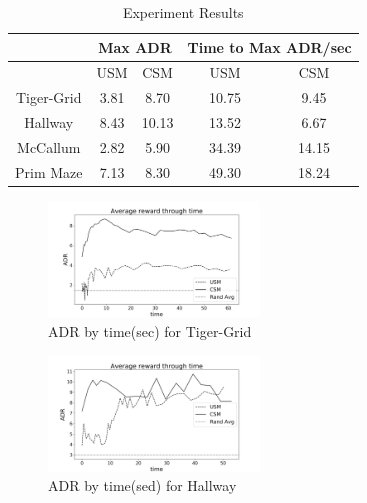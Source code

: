 \documentclass{article}
\begin{document}
\begin{table}[]
	  \caption{Experiment Results}
	\label{table:results}
	\centering
	\begin{tabular}{|c|c|c|c|c|}
		\hline
		& \multicolumn{2}{c|}{Max ADR} & \multicolumn{2}{c|}{Time to Max ADR/sec} \\ \hline
		& USM           & CSM          & USM                 & CSM                \\ \hline
		Tiger-Grid &3.81              & 8.70            &10.75                   & 9.45                  \\ \hline
		Hallway    & 8.43             & 10.13             & 13.52                 & 6.67                  \\ \hline
		McCallum   & 2.82             &5.90          & 34.39                  & 14.15                 \\ \hline
		Prim Maze  &7.13            & 8.30           &49.30                   & 18.24                 \\ \hline
	\end{tabular}
\end{table}


\begin{figure}
	\centering
	\includegraphics[width=0.5\textwidth]{06-13-21-48/tiger_grid_result.png} %
	\caption{ADR by time(sec) for Tiger-Grid} %
	\label{fig:tiger_grid_result} %
\end{figure}

\begin{figure}
	\centering
	\includegraphics[width=0.5\textwidth]{06-13-21-48/hallway_result.png} %
	\caption{ADR by time(sed) for Hallway} %
	\label{fig:hallway_result} %
\end{figure}
\end{document}

